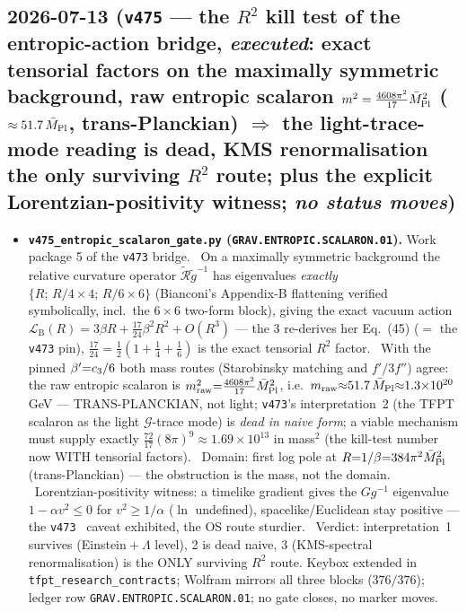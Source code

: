 \subsection*{2026-07-13 (\texttt{v475} --- the $R^2$ kill test of the entropic-action bridge, \emph{executed}: exact tensorial factors on the maximally symmetric background, raw entropic scalaron $m^2=\tfrac{4608\pi^2}{17}\bar M_{\mathrm{Pl}}^2$ ($\approx51.7\,\bar M_{\mathrm{Pl}}$, trans-Planckian) $\Rightarrow$ the light-trace-mode reading is dead, KMS renormalisation the only surviving $R^2$ route; plus the explicit Lorentzian-positivity witness; \emph{no status moves})}
\begin{itemize}[leftmargin=1.5em]
\item \textbf{\texttt{v475\_entropic\_scalaron\_gate.py} (\texttt{GRAV.ENTROPIC.SCALARON.01}).} Work
package 5 of the \texttt{v473} bridge. \mE\ On a maximally symmetric background the relative curvature
operator $\widetilde{\mathcal R}\widetilde g^{-1}$ has eigenvalues \emph{exactly}
$\{R;\,R/4{\times}4;\,R/6{\times}6\}$ (Bianconi's Appendix-B flattening verified symbolically,
incl.\ the $6{\times}6$ two-form block), giving the exact vacuum action
$\mathcal L_{\mathrm B}(R)=3\beta R+\tfrac{17}{24}\beta^2R^2+O(R^3)$ --- the $3$ re-derives her
Eq.~(45) ($=$ the \texttt{v473} pin), $\tfrac{17}{24}{=}\tfrac12(1{+}\tfrac14{+}\tfrac16)$ is the exact
tensorial $R^2$ factor. \mE\ With the pinned $\beta'{=}c_3/6$ both mass routes (Starobinsky
matching and $f'/3f''$) agree: the raw entropic scalaron is $m_{\mathrm{raw}}^2{=}\tfrac{4608\pi^2}{17}
\bar M_{\mathrm{Pl}}^2$, i.e.\ $m_{\mathrm{raw}}{\approx}51.7\,\bar M_{\mathrm{Pl}}{\approx}1.3{\times}10^{20}$\,GeV ---
TRANS-PLANCKIAN, not light; \texttt{v473}'s interpretation~2 (the TFPT scalaron as the light
$\mathcal G$-trace mode) is \emph{dead in naive form}; a viable mechanism must supply exactly
$\tfrac{72}{17}(8\pi)^9{\approx}1.69{\times}10^{13}$ in mass$^2$ (the kill-test number now WITH
tensorial factors). \mE\ Domain: first log pole at $R{=}1/\beta{=}384\pi^2\bar M_{\mathrm{Pl}}^2$ (trans-Planckian)
--- the obstruction is the mass, not the domain. \mE\ Lorentzian-positivity witness: a timelike
gradient gives the $Gg^{-1}$ eigenvalue $1-\alpha v^2\le0$ for $v^2\ge1/\alpha$ ($\ln$ undefined),
spacelike/Euclidean stay positive --- the \texttt{v473} \mC\ caveat exhibited, the OS route sturdier.
\mC\ Verdict: interpretation~1 survives (Einstein${}+\Lambda$ level), 2 is dead naive, 3 (KMS-spectral
renormalisation) is the ONLY surviving $R^2$ route. Keybox extended in
\texttt{tfpt\_research\_contracts}; Wolfram mirrors all three blocks ($376/376$); ledger row
\texttt{GRAV.ENTROPIC.SCALARON.01}; no gate closes, no marker moves.
\end{itemize}


